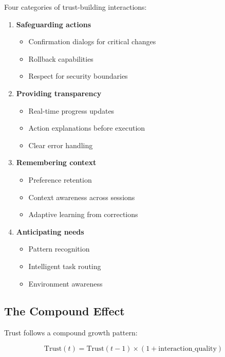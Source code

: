 Four categories of trust-building interactions:

\begin{enumerate}
    \item \textbf{Safeguarding actions}
    \begin{itemize}
        \item Confirmation dialogs for critical changes
        \item Rollback capabilities
        \item Respect for security boundaries
    \end{itemize}

    \item \textbf{Providing transparency}
    \begin{itemize}
        \item Real-time progress updates
        \item Action explanations before execution
        \item Clear error handling
    \end{itemize}

    \item \textbf{Remembering context}
    \begin{itemize}
        \item Preference retention
        \item Context awareness across sessions
        \item Adaptive learning from corrections
    \end{itemize}

    \item \textbf{Anticipating needs}
    \begin{itemize}
        \item Pattern recognition
        \item Intelligent task routing
        \item Environment awareness
    \end{itemize}
\end{enumerate}

\subsection{The Compound Effect}
\label{subsec:compound-effect}

Trust follows a compound growth pattern:

\begin{equation}
\text{Trust}(t) = \text{Trust}(t-1) \times (1 + \text{interaction\_quality})
\end{equation}

